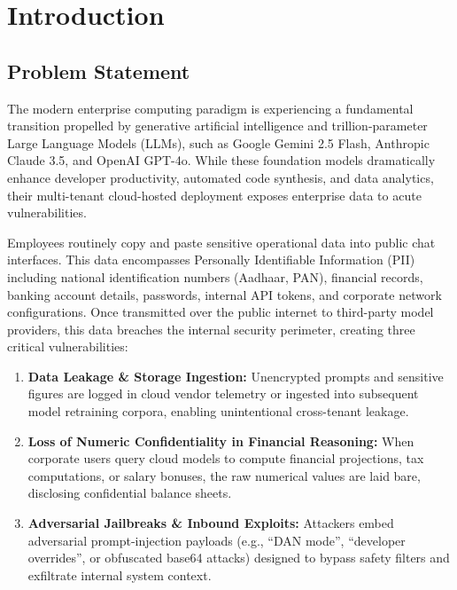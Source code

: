 \chapter{Introduction}

\section{Problem Statement}
The modern enterprise computing paradigm is experiencing a fundamental transition propelled by generative artificial intelligence and trillion-parameter Large Language Models (LLMs), such as Google Gemini 2.5 Flash, Anthropic Claude 3.5, and OpenAI GPT-4o. While these foundation models dramatically enhance developer productivity, automated code synthesis, and data analytics, their multi-tenant cloud-hosted deployment exposes enterprise data to acute vulnerabilities.

Employees routinely copy and paste sensitive operational data into public chat interfaces. This data encompasses Personally Identifiable Information (PII) including national identification numbers (Aadhaar, PAN), financial records, banking account details, passwords, internal API tokens, and corporate network configurations. Once transmitted over the public internet to third-party model providers, this data breaches the internal security perimeter, creating three critical vulnerabilities:
\begin{enumerate}[leftmargin=*]
    \item \textbf{Data Leakage \& Storage Ingestion:} Unencrypted prompts and sensitive figures are logged in cloud vendor telemetry or ingested into subsequent model retraining corpora, enabling unintentional cross-tenant leakage.
    \item \textbf{Loss of Numeric Confidentiality in Financial Reasoning:} When corporate users query cloud models to compute financial projections, tax computations, or salary bonuses, the raw numerical values are laid bare, disclosing confidential balance sheets.
    \item \textbf{Adversarial Jailbreaks \& Inbound Exploits:} Attackers embed adversarial prompt-injection payloads (e.g., ``DAN mode'', ``developer overrides'', or obfuscated base64 attacks) designed to bypass safety filters and exfiltrate internal system context.
\end{enumerate}


